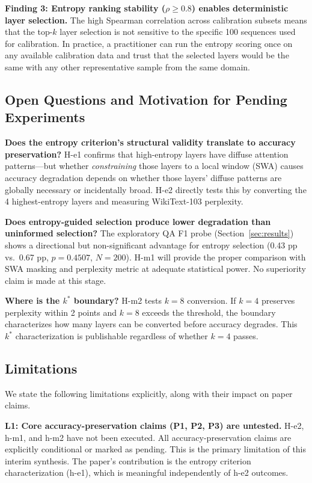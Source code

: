\textbf{Finding 3: Entropy ranking stability ($\rho \geq 0.8$) enables deterministic layer selection.} The high Spearman correlation across calibration subsets means that the top-$k$ layer selection is not sensitive to the specific 100 sequences used for calibration. In practice, a practitioner can run the entropy scoring once on any available calibration data and trust that the selected layers would be the same with any other representative sample from the same domain.

\subsection{Open Questions and Motivation for Pending Experiments}

\textbf{Does the entropy criterion's structural validity translate to accuracy preservation?} H-e1 confirms that high-entropy layers have diffuse attention patterns---but whether \textit{constraining} those layers to a local window (SWA) causes accuracy degradation depends on whether those layers' diffuse patterns are globally necessary or incidentally broad. H-e2 directly tests this by converting the 4 highest-entropy layers and measuring WikiText-103 perplexity.

\textbf{Does entropy-guided selection produce lower degradation than uninformed selection?} The exploratory QA F1 probe (Section~\ref{sec:results}) shows a directional but non-significant advantage for entropy selection (0.43 pp vs.\ 0.67 pp, $p=0.4507$, $N=200$). H-m1 will provide the proper comparison with SWA masking and perplexity metric at adequate statistical power. No superiority claim is made at this stage.

\textbf{Where is the $k^*$ boundary?} H-m2 tests $k = 8$ conversion. If $k = 4$ preserves perplexity within 2 points and $k = 8$ exceeds the threshold, the boundary characterizes how many layers can be converted before accuracy degrades. This $k^*$ characterization is publishable regardless of whether $k = 4$ passes.

\subsection{Limitations}

We state the following limitations explicitly, along with their impact on paper claims.

\textbf{L1: Core accuracy-preservation claims (P1, P2, P3) are untested.} H-e2, h-m1, and h-m2 have not been executed. All accuracy-preservation claims are explicitly conditional or marked as pending. This is the primary limitation of this interim synthesis. The paper's contribution is the entropy criterion characterization (h-e1), which is meaningful independently of h-e2 outcomes.

